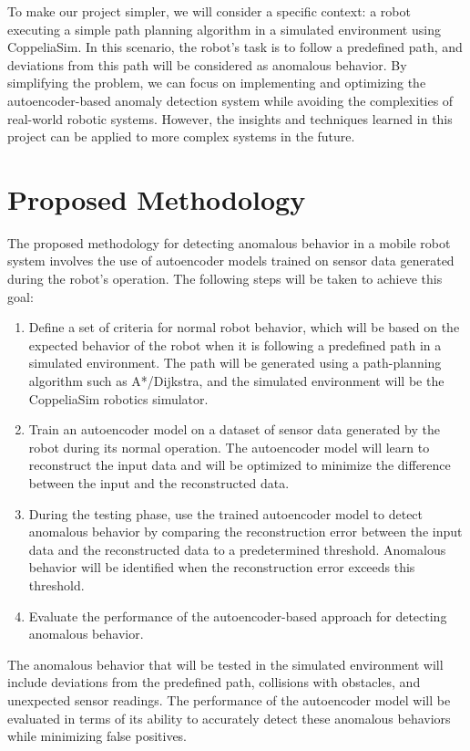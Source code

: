 \documentclass[12]{article}
\begin{document}
To make our project simpler, we will consider a specific context: a robot executing a simple path planning algorithm in a simulated environment using CoppeliaSim. In this scenario, the robot's task is to follow a predefined path, and deviations from this path will be considered as anomalous behavior. By simplifying the problem, we can focus on implementing and optimizing the autoencoder-based anomaly detection system while avoiding the complexities of real-world robotic systems. However, the insights and techniques learned in this project can be applied to more complex systems in the future.



\section{Proposed Methodology}


The proposed methodology for detecting anomalous behavior in a mobile robot system involves the use of autoencoder models trained on sensor data generated during the robot's operation. The following steps will be taken to achieve this goal:

\begin{enumerate}

\item Define a set of criteria for normal robot behavior, which will be based on the expected behavior of the robot when it is following a predefined path in a simulated environment. The path will be generated using a path-planning algorithm such as A*/Dijkstra, and the simulated environment will be the CoppeliaSim robotics simulator.

\item Train an autoencoder model on a dataset of sensor data generated by the robot during its normal operation. The autoencoder model will learn to reconstruct the input data and will be optimized to minimize the difference between the input and the reconstructed data.

\item During the testing phase, use the trained autoencoder model to detect anomalous behavior by comparing the reconstruction error between the input data and the reconstructed data to a predetermined threshold. Anomalous behavior will be identified when the reconstruction error exceeds this threshold. 


\item Evaluate the performance of the autoencoder-based approach for detecting anomalous behavior.

\end{enumerate}
The anomalous behavior that will be tested in the simulated environment will include deviations from the predefined path, collisions with obstacles, and unexpected sensor readings. The performance of the autoencoder model will be evaluated in terms of its ability to accurately detect these anomalous behaviors while minimizing false positives.
\end{document}
